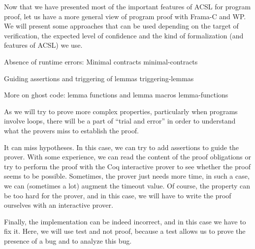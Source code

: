 Now that we have presented most of the important features of ACSL for program
proof, let us have a more general view of program proof with Frama-C and WP. We
will present some approaches that can be used depending on the target of
verification, the expected level of confidence and the kind of formalization
(and features of ACSL) we use.



\begin{levelTwo}
  {Absence of runtime errors: Minimal contracts}
  {minimal-contracts}
\end{levelTwo}

\begin{levelTwo}
  {Guiding assertions and triggering of lemmas}
  {triggering-lemmas}
\end{levelTwo}

\begin{levelTwo}
  {More on ghost code: lemma functions and lemma macros}
  {lemma-functions}
\end{levelTwo}



\horizontalLine
\newpage

As we will try to prove more complex properties, particularly when
programs involve loops, there will be a part of ``trial and error'' in
order to understand what the provers miss to establish the proof.

It can miss hypotheses. In this case, we can try to add assertions to
guide the prover. With some experience, we can read the content of the
proof obligations or try to perform the proof with the Coq interactive
prover to see whether the proof seems to be possible. Sometimes, the
prover just needs more time, in such a case, we can (sometimes a lot)
augment the timeout value. Of course, the property can be too hard for
the prover, and in this case, we will have to write the proof ourselves
with an interactive prover.

Finally, the implementation can be indeed incorrect, and in this case we
have to fix it. Here, we will use test and not proof, because a test
allows us to prove the presence of a bug and to analyze this bug.
